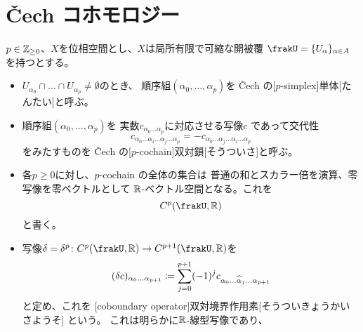 \documentclass[report]{jlreq}
\begin{document}
\section{\v{C}ech コホモロジー}

\begin{definition}
    $p \in \mathbb{Z}_{\ge 0}$、$X$を位相空間とし、$X$は局所有限で可縮な開被覆
    $\frakU = \{U_\alpha\}_{\alpha \in A}$を持つとする\footnotemark{}。
    \begin{itemize}
        \item $U_{\alpha_0} \cap \dots \cap U_{\alpha_p} \neq \emptyset$のとき、
            順序組$(\alpha_0, \dots, \alpha_p)$を
            \v{C}ech の[$p$-simplex]{単体}[たんたい]と呼ぶ。
        \item 順序組$(\alpha_0, \dots, \alpha_p)$を
            実数$c_{\alpha_0 \dots \alpha_p}$に対応させる写像$c$
            であって交代性
            \begin{equation}
                c_{\alpha_0 \dots \alpha_i \dots \alpha_j \dots \alpha_p}
                    = - c_{\alpha_0 \dots \alpha_j \dots \alpha_i \dots \alpha_p}
            \end{equation}
            をみたすものを
            \v{C}ech の[$p$-cochain]{双対鎖}[そうついさ]と呼ぶ。
        \item 各$p \ge 0$に対し、$p$-cochain の全体の集合は
            普通の和とスカラー倍を演算、零写像を零ベクトルとして
            $\mathbb{R}$-ベクトル空間となる。これを
            \begin{equation}
                C^p(\frakU, \R)
            \end{equation}
            と書く。
        \item 写像$\delta = \delta^{p}
            \colon C^p(\frakU, \R) \to C^{p+1}(\frakU, \R)$を
            \begin{equation}
                (\delta c)_{\alpha_0 \dots \alpha_{p + 1}}
                    \coloneqq \sum_{j = 0}^{p + 1}
                    (-1)^j c_{\alpha_0 \dots \widehat{\alpha}_j \dots \alpha_{p + 1}}
            \end{equation}
            と定め、これを
            [coboundary operator]{双対境界作用素}[そうついきょうかいさようそ]
            という。
            これは明らかに$\mathbb{R}$-線型写像であり、

\end{itemize}
\end{definition}
\end{document}
